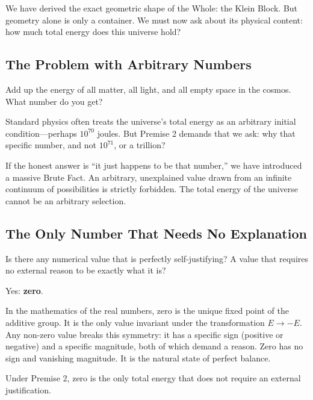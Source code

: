 \documentclass[11pt]{article}
\theoremstyle{canonstyle}
\begin{document}
We have derived the exact geometric shape of the Whole: the Klein Block. But geometry alone is only a container. We must now ask about its physical content: how much total energy does this universe hold?

\subsection{The Problem with Arbitrary Numbers}

\begin{reflect}
Add up the energy of all matter, all light, and all empty space in the cosmos. What number do you get?
\end{reflect}

Standard physics often treats the universe's total energy as an arbitrary initial condition---perhaps $10^{70}$ joules. But Premise 2 demands that we ask: why that specific number, and not $10^{71}$, or a trillion? 

If the honest answer is ``it just happens to be that number,'' we have introduced a massive Brute Fact. An arbitrary, unexplained value drawn from an infinite continuum of possibilities is strictly forbidden. The total energy of the universe cannot be an arbitrary selection.

\subsection{The Only Number That Needs No Explanation}

\begin{reflect}
Is there any numerical value that is perfectly self-justifying? A value that requires no external reason to be exactly what it is?
\end{reflect}

Yes: \textbf{zero}. 

In the mathematics of the real numbers, zero is the unique fixed point of the additive group. It is the only value invariant under the transformation $E \to -E$. Any non-zero value breaks this symmetry: it has a specific sign (positive or negative) and a specific magnitude, both of which demand a reason. Zero has no sign and vanishing magnitude. It is the natural state of perfect balance. 

Under Premise 2, zero is the only total energy that does not require an external justification. 
\end{document}
